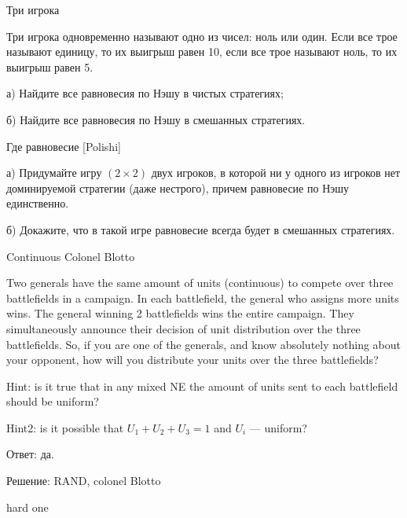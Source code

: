 \begin{problem}
 Три игрока\par
Три игрока одновременно называют одно из чисел: ноль или один. Если все трое называют единицу, то их выигрыш равен 10, если все трое называют ноль, то их выигрыш равен 5.\par
а)	Найдите все равновесия по Нэшу в чистых стратегиях;\par
б)	Найдите все равновесия по Нэшу в смешанных стратегиях.



\begin{sol}

\end{sol}
\end{problem}



\begin{problem}
 Где равновесие [Polishi]\par
а)	Придумайте игру  $\left(2\times 2\right)$  двух игроков, в которой ни у одного из игроков нет доминируемой стратегии (даже нестрого), причем равновесие по Нэшу единственно.\par
б)	Докажите, что в такой игре равновесие всегда будет в смешанных стратегиях.



\begin{sol}

\end{sol}
\end{problem}



\begin{problem}
 Continuous Colonel Blotto \par
Two generals have the same amount of units (continuous) to compete over three battlefields in a campaign. In each battlefield, the general who assigns more units wins. The general winning 2 battlefields wins the entire campaign. They simultaneously announce their decision of unit distribution over the three battlefields. So, if you are one of the generals, and know absolutely nothing about your opponent, how will you distribute your units over the three battlefields? \par
Hint: is it true that in any mixed NE the amount of units sent to each battlefield should be uniform? \par
Hint2: is it possible that $U_{1}+U_{2}+U_{3}=1$ and $U_{i}$ — uniform? \par
Ответ: да. \par
Решение: RAND, colonel Blotto \par
hard one



\begin{sol}

\end{sol}
\end{problem}



